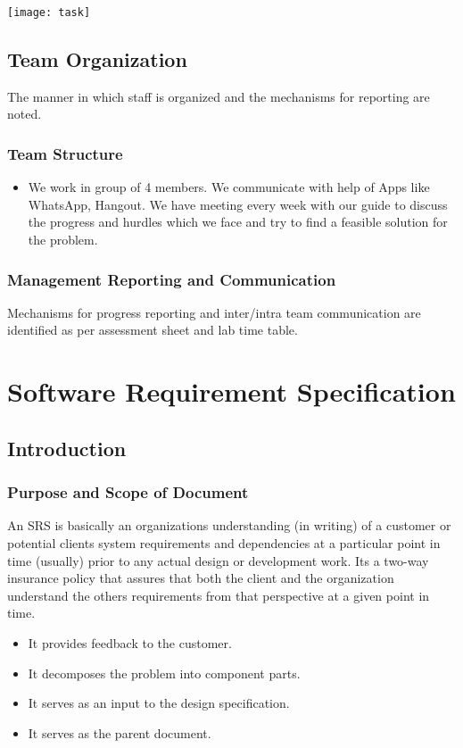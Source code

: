 \documentclass[oneside,a4paper,12pt]{book}
\begin{document}
\begin{enumerate}
\texttt{[image: task]}

 
\section{Team Organization}
The manner in which staff is organized and the mechanisms for reporting are noted.  
\subsection{Team Structure}\begin{itemize}
  \item We work in group of 4 members. We communicate with help of Apps like WhatsApp, Hangout. We have meeting every week with our guide to discuss the progress and hurdles which we face and try to find a feasible solution for the problem.
\end{itemize}

\subsection{Management Reporting and Communication}
Mechanisms for progress reporting and inter/intra team communication are identified as per assessment sheet and lab time table. 
 
\chapter{Software Requirement Specification  }

\section{Introduction}
\subsection{Purpose and Scope of Document}
An SRS is basically an organizations understanding (in writing) of a customer or potential clients system requirements and dependencies at a particular point in time (usually) prior to any actual design or development work. Its a two-way insurance policy that assures that both the client and the organization understand the others requirements from that perspective at a given point in time.
\begin{itemize}
\item It provides feedback to the customer.
\item It decomposes the problem into component parts.
\item It serves as an input to the design specification.
\item It serves as the parent document.
\end{itemize}


\end{enumerate}
\end{document}
